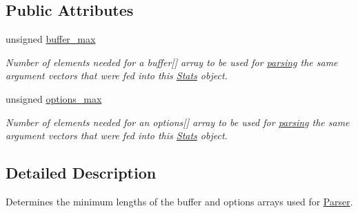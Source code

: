 \subsection*{Public Attributes}
\begin{DoxyCompactItemize}
\item 
unsigned \hyperlink{struct_option_parser_1_1_stats_adc083894c6e07752640cc108a67d6b63}{buffer\-\_\-max}
\begin{DoxyCompactList}\small\item\em Number of elements needed for a {\ttfamily buffer}\mbox{[}\mbox{]} array to be used for \hyperlink{class_option_parser_1_1_parser_adbde29c0025d0ec88f8b41a656ab45a1}{parsing} the same argument vectors that were fed into this \hyperlink{struct_option_parser_1_1_stats}{Stats} object. \end{DoxyCompactList}\item 
unsigned \hyperlink{struct_option_parser_1_1_stats_a32b27e18309da5c4c6ebc5ee3e42f98c}{options\-\_\-max}
\begin{DoxyCompactList}\small\item\em Number of elements needed for an {\ttfamily options}\mbox{[}\mbox{]} array to be used for \hyperlink{class_option_parser_1_1_parser_adbde29c0025d0ec88f8b41a656ab45a1}{parsing} the same argument vectors that were fed into this \hyperlink{struct_option_parser_1_1_stats}{Stats} object. \end{DoxyCompactList}\end{DoxyCompactItemize}


\subsection{Detailed Description}
Determines the minimum lengths of the buffer and options arrays used for \hyperlink{class_option_parser_1_1_parser}{Parser}. 

